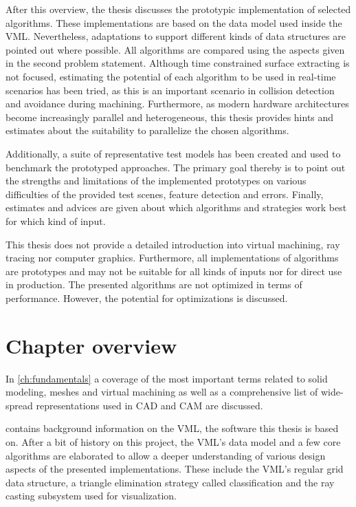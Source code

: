 After this overview, the thesis discusses the prototypic implementation of selected algorithms.
These implementations are based on the data model used inside the VML.
Nevertheless, adaptations to support different kinds of data structures are pointed out where possible.
All algorithms are compared using the aspects given in the second problem statement.
Although time constrained surface extracting is not focused, estimating the potential of each algorithm to be used in real-time scenarios has been tried, as this is an important scenario in collision detection and avoidance during machining. %
Furthermore, as modern hardware architectures become increasingly parallel and heterogeneous, this thesis provides hints and estimates about the suitability to parallelize the chosen algorithms.

Additionally, a suite of representative test models has been created and used to benchmark the prototyped approaches.
The primary goal thereby is to point out the strengths and limitations of the implemented prototypes on various difficulties of the provided test scenes, \eg feature detection and errors.
Finally, estimates and advices are given about which algorithms and strategies work best for which kind of input.

This thesis does not provide a detailed introduction into virtual machining, ray tracing nor computer graphics.
Furthermore, all implementations of algorithms are prototypes and may not be suitable for all kinds of inputs nor for direct use in production.
The presented algorithms are not optimized in terms of performance.
However, the potential for optimizations is discussed.


\section{Chapter overview}
\label{sec:chapter_overview}

In \cref{ch:fundamentals} a coverage of the most important terms related to solid modeling, meshes and virtual machining as well as a comprehensive list of wide-spread representations used in CAD and CAM are discussed.

 contains background information on the VML, the software this thesis is based on.
After a bit of history on this project, the VML's data model and a few core algorithms are elaborated to allow a deeper understanding of various design aspects of the presented implementations. These include the VML's regular grid data structure, a triangle elimination strategy called classification and the ray casting subsystem used for visualization.

